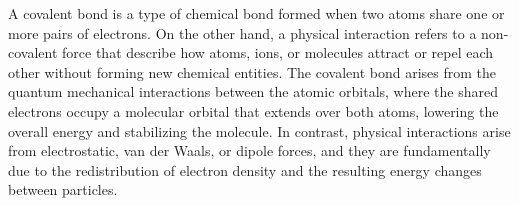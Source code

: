 A covalent bond is a type of chemical bond formed when two atoms share one or more pairs of electrons. 
On the other hand, a physical interaction refers to a non-covalent force that describe how atoms, ions, or molecules attract or repel each other without forming new chemical entities. 
The covalent bond arises from the quantum mechanical interactions between the atomic orbitals, where the shared electrons occupy a molecular orbital that extends over both atoms, lowering the overall energy and stabilizing the molecule.
In contrast, physical interactions arise from electrostatic, van der Waals, or dipole forces, and they are fundamentally due to the redistribution of electron density and the resulting energy changes between particles.


